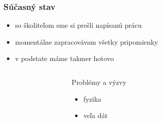 \documentclass{beamer}
\begin{document}
\begin{frame}
	\frametitle{Súčasný stav}
   
	\begin{itemize}
		\item so školiteľom sme si prešli napísanú prácu
        \item momentálne zapracovávam všetky pripomienky
        \item v podstate máme takmer hotovo
	\end{itemize}

    \begin{columns}[T] %
        \begin{column}{0.05\textwidth} %
        \end{column}
        \begin{column}{0.9\textwidth} %
            \begin{block}{Problémy a výzvy}
                \begin{itemize}
                    \item fyzika
                    \item veľa dát
                \end{itemize}
            \end{block}
        \end{column}
        \begin{column}{0.05\textwidth} %
        \end{column}
    \end{columns}
\end{frame}
\end{document}
